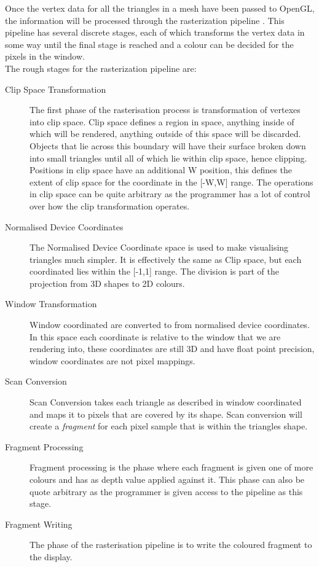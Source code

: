 Once the vertex data for all the triangles in a mesh have been passed to OpenGL,
the information will be processed through the rasterization pipeline
\cite{rasterization}. This 
pipeline has several discrete stages, each of which transforms the vertex data 
in some way until the final stage is reached and a colour can be decided for the
pixels in the window.\\

The rough stages for the rasterization pipeline are:
\begin{description}
\item[Clip Space Transformation] The first phase of the rasterisation process
is transformation of vertexes into clip space. Clip space defines a region in 
space, anything inside of which will be rendered, anything outside of this space
will be discarded. Objects that lie across this boundary will have their surface
broken down into small triangles until all of which lie within clip space, hence
clipping. Positions in clip space have an additional W position, this defines the
extent of clip space for the coordinate in the [-W,W] range.
The operations in clip space can be quite arbitrary as the programmer 
has a lot of control over how the clip transformation operates.

\item[Normalised Device Coordinates] The Normalised Device Coordinate space is 
used to make visualising triangles much simpler. It is effectively the same as 
Clip space, but each coordinated lies within the [-1,1] range. The division is 
part of the projection from 3D shapes to 2D colours.
\item[Window Transformation] Window coordinated are converted to from normalised
device coordinates. In this space each coordinate is relative to the window that
we are rendering into, these coordinates are still 3D and have float point 
precision, window coordinates are not pixel mappings.
\item[Scan Conversion] Scan Conversion takes each triangle as described in 
window coordinated and maps it to pixels that are covered by its shape. Scan 
conversion will create a \emph{fragment} for each pixel sample that is within
the triangles shape.
\item[Fragment Processing] Fragment processing is the phase where each fragment 
is given one of more colours and has as depth value applied against it. This 
phase can also be quote arbitrary as the programmer is given access to the pipeline
as this stage.
\item[Fragment Writing] The phase of the rasterisation pipeline is to write the 
coloured fragment to the display.
\end{description}

